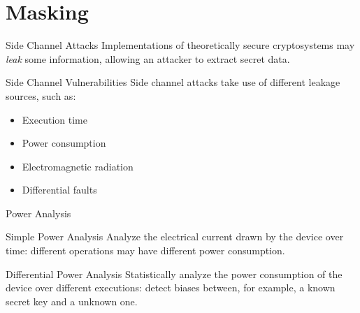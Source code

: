 \section{Masking}

\begin{frame}
    \sectionpage
\end{frame}

\begin{frame}{Side Channel Attacks}
    Implementations of theoretically secure cryptosystems may \textit{leak} some information, allowing an 
    attacker to extract secret data.
    \begin{block}{Side Channel Vulnerabilities}
        Side channel attacks take use of different leakage sources, such as:
        \begin{itemize}
            \item Execution time
            \item Power consumption
            \item Electromagnetic radiation
            \item Differential faults
        \end{itemize}
    \end{block}
\end{frame}

\begin{frame}{Power Analysis}
    \begin{block}{Simple Power Analysis}
        Analyze the electrical current drawn by the device over time: different operations may have different power consumption.
    \end{block}
    \begin{block}{Differential Power Analysis}
        Statistically analyze the power consumption of the device over different executions: detect biases between, for example, a known secret key and a unknown one.
    \end{block}
\end{frame}

